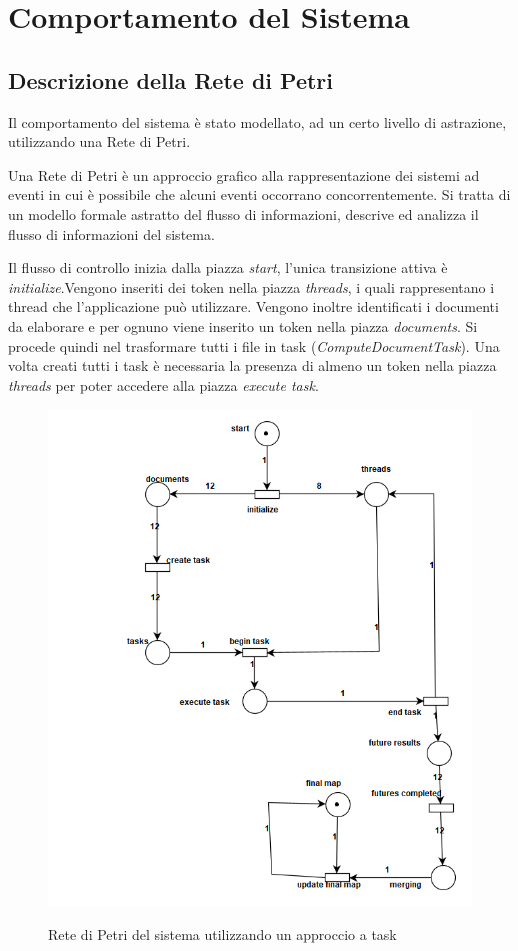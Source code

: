 \section{Comportamento del Sistema}
\subsection{Descrizione della Rete di Petri} \label{PN-part1}
Il comportamento del sistema è stato modellato, ad un certo livello di astrazione, utilizzando una Rete di Petri.
\begin{question}
Una Rete di Petri è un approccio grafico alla rappresentazione dei sistemi ad eventi in cui è possibile che alcuni eventi occorrano concorrentemente. Si tratta di un modello formale astratto del flusso di informazioni, descrive ed analizza il flusso di informazioni del sistema.
\end{question}
Il flusso di controllo inizia dalla piazza \textit{start}, l'unica transizione attiva è \textit{initialize}.\newline Vengono inseriti dei token nella piazza \textit{threads}, i quali rappresentano i thread che l'applicazione può utilizzare.
Vengono inoltre identificati i documenti da elaborare e per ognuno viene inserito un token nella piazza \textit{documents}.
Si procede quindi nel trasformare tutti i file in task (\textit{ComputeDocumentTask}).\newline
Una volta creati tutti i task è necessaria la presenza di almeno un token nella piazza \textit{threads} per poter accedere alla piazza \textit{execute task}.
\begin{figure}[H]
    \caption{Rete di Petri del sistema utilizzando un approccio a task}
    \centering
    \includegraphics[width=120mm]{img/Petri net - Task frameworks.png}
    \label{fig:task_petri}
\end{figure}
